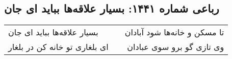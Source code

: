 \begin{center}
\section*{رباعی شماره ۱۴۴۱: بسیار علاقه‌ها بباید ای جان}
\label{sec:1441}
\begin{longtable}{l p{0.5cm} r}
بسیار علاقه‌ها بباید ای جان
&&
تا مسکن و خانه‌ها شود آبادان
\\
ای بلغاری تو خانه کن در بلغار
&&
وی تازی گو برو سوی عبادان
\\
\end{longtable}
\end{center}
